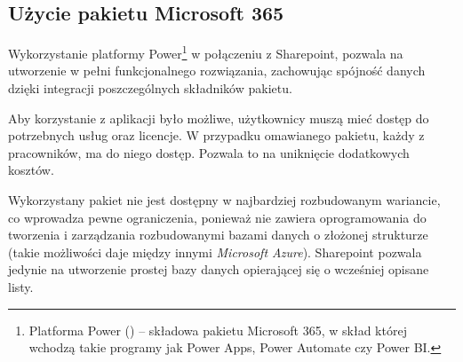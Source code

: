 \subsection{Użycie pakietu Microsoft 365}
\begin{comment}


Wykorzystanie platformy Power\footnote{Platforma Power (\english{Power Platform}) -- Składowa pakietu Microsoft 365. Zawiera ona takie programy jak Power Apps, Power Automate czy Power BI.} w połączeniu z Sharepoint, pozwala na utworzenie w pełni funkcjonalnego rozwiązania, zachowując spójność danych dzięki integracji poszczególnych składników pakietu.

Aby korzystanie z aplikacji było możliwe, użytkownicy muszą mieć dostęp do potrzebnych usług oraz licencje. W przypadku omawianego pakietu, każdy z pracowników, ma do niego dostęp. Pozwala to na uniknięcie dodatkowych kosztów.

Niestety użyty pakiet, nie jest dostępny w najbardziej rozbudowanym wariancie. Wprowadza to pewne ograniczenia, ponieważ brakuje w nim oprogramowania do tworzenia i zarządzania rozbudowanymi bazami danych o złożonej strukturze (takie możliwości daje między innymi \emph{Microsoft Azure}).
Sharepoint pozwala jedynie na utworzenie prostej bazy danych opierającej się o wcześniej opisane listy.  Głównym problemem było ograniczenie związane z brakiem możliwości tworzenia relacji między kilkoma listami, co znacząco utrudniało zarządzanie danymi o złożonej strukturze.

\end{comment}

Wykorzystanie platformy Power\footnote{Platforma Power () -- składowa pakietu Microsoft 365, w skład której wchodzą takie programy jak Power Apps, Power Automate czy Power BI.} w połączeniu z Sharepoint, pozwala na utworzenie w pełni funkcjonalnego rozwiązania, zachowując spójność danych dzięki integracji poszczególnych składników pakietu.

Aby korzystanie z aplikacji było możliwe, użytkownicy muszą mieć dostęp do potrzebnych usług oraz licencje. W przypadku omawianego pakietu, każdy z pracowników, ma do niego dostęp. Pozwala to na uniknięcie dodatkowych kosztów.

Wykorzystany pakiet nie jest dostępny w najbardziej rozbudowanym wariancie, co wprowadza pewne ograniczenia, ponieważ nie zawiera oprogramowania do tworzenia i zarządzania rozbudowanymi bazami danych o złożonej strukturze (takie możliwości daje między innymi \emph{Microsoft Azure}).
Sharepoint pozwala jedynie na utworzenie prostej bazy danych opierającej się o wcześniej opisane listy.


